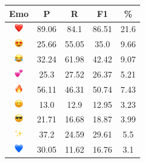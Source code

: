 \documentclass{article}
\begin{document}
\begin{table}
\centering
\begin{tabular}{|c|ccc|c|} \hline
\textbf{Emo} & \textbf{P} & \textbf{R} & \textbf{F1} & \textbf{\%} \\ \hline
\includegraphics[height=0.37cm,width=0.37cm]{img/red_heart.png} & 89.06 & 84.1 & 86.51 & 21.6\\ 
\includegraphics[height=0.37cm,width=0.37cm]{img/smiling_face_with_hearteyes.png} & 25.66 & 55.05 & 35.0 & 9.66\\ 
\includegraphics[height=0.37cm,width=0.37cm]{img/face_with_tears_of_joy.png} & 32.24 & 61.98 & 42.42 & 9.07\\ 
\includegraphics[height=0.37cm,width=0.37cm]{img/two_hearts.png} & 25.3 & 27.52 & 26.37 & 5.21\\ 
\includegraphics[height=0.37cm,width=0.37cm]{img/fire.png} & 56.11 & 46.31 & 50.74 & 7.43\\ 
\includegraphics[height=0.37cm,width=0.37cm]{img/smiling_face_with_smiling_eyes.png} & 13.0 & 12.9 & 12.95 & 3.23\\ 
\includegraphics[height=0.37cm,width=0.37cm]{img/smiling_face_with_sunglasses.png} & 21.71 & 16.68 & 18.87 & 3.99\\ 
\includegraphics[height=0.37cm,width=0.37cm]{img/sparkles.png} & 37.2 & 24.59 & 29.61 & 5.5\\ 
\includegraphics[height=0.37cm,width=0.37cm]{img/blue_heart.png} & 30.05 & 11.62 & 16.76 & 3.1\\ 

\end{tabular}
\end{table}
\end{document}
